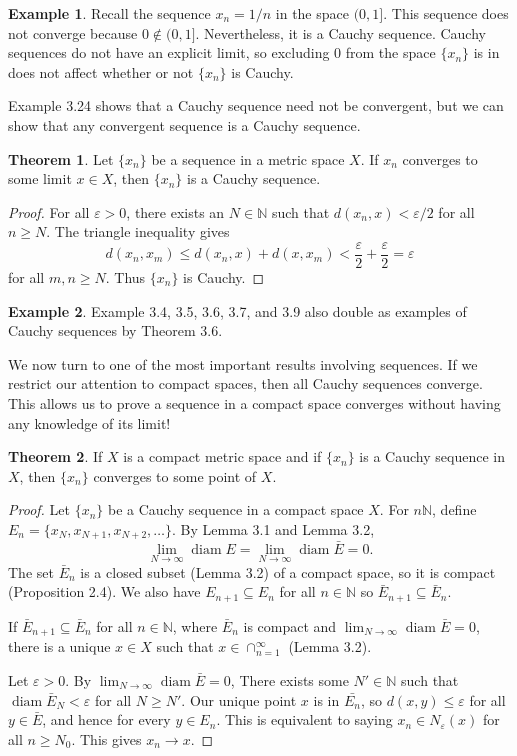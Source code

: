 \documentclass{article}
\newcommand{\N}{\mathbb{N}}
\DeclareMathOperator{\diam}{diam}
\theoremstyle{definition}
\newtheorem{theorem}{Theorem}[section]
\newtheorem{example}{Example}[section]
\begin{document}
	\begin{example}
		Recall the sequence $ x_n=1/n $ in the space $ (0,1] $. This sequence does not converge because $ 0\notin(0,1] $. Nevertheless, it is a Cauchy sequence. Cauchy sequences do not have an explicit limit, so excluding $ 0 $ from the space $ \{x_n\} $ is in does not affect whether or not $ \{x_n\} $ is Cauchy.
	\end{example}
	Example 3.24 shows that a Cauchy sequence need not be convergent, but we can show that any convergent sequence is a Cauchy sequence.
	\begin{theorem}
		Let $ \{x_n\} $ be a sequence in a metric space $ X $. If $ x_n $ converges to some limit $ x\in X $, then $ \{x_n\} $ is a Cauchy sequence. 
	\end{theorem} 
	\begin{proof}
		For all $ \varepsilon>0 $, there exists an $ N\in\N $ such that $ d(x_n,x)<\varepsilon/2 $ for all $ n\ge N $. The triangle inequality gives $$d(x_n,x_m)\le d(x_n,x)+d(x,x_m)<\frac{\varepsilon}{2}+\frac{\varepsilon}{2}=\varepsilon $$ for all $ m,n\ge N $. Thus $ \{x_n\} $ is Cauchy. 
	\end{proof}
	\begin{example}
		Example 3.4, 3.5, 3.6, 3.7, and 3.9 also double as examples of Cauchy sequences by Theorem 3.6.
	\end{example}
	We now turn to one of the most important results involving sequences. If we restrict our attention to compact spaces, then all Cauchy sequences converge. This allows us to prove a sequence in a compact space converges without having any knowledge of its limit! 
	\begin{theorem}
		If $ X $ is a compact metric space and if $ \{x_n\} $ is a Cauchy sequence in $ X $, then $ \{x_n\} $ converges to some point of $ X $.
	\end{theorem}
	\begin{proof}
		Let $ \{x_n\} $ be a Cauchy sequence in a compact space $ X $. For $ n\N $, define $ E_n=\{x_N,x_{N+1},x_{N+2},\ldots\} $. By Lemma 3.1 and Lemma 3.2, $$ \lim_{N\to\infty} \diam E=\lim_{N\to\infty} \diam\bar{E}=0. $$ The set $ \bar{E}_n $ is a closed subset (Lemma 3.2) of a compact space, so it is compact (Proposition 2.4). We also have $ E_{n+1}\subseteq E_n $ for all $ n\in\N $ so $ \bar{E}_{n+1}\subseteq \bar{E}_n $.
		
		If  $ \bar{E}_{n+1}\subseteq \bar{E}_n $ for all $ n\in\N $, where $ \bar{E}_n $ is compact and 	$ \lim_{N\to\infty} \diam\bar{E}=0 $, there is a unique $ x\in X $ such that $ x\in\cap_{n=1}^\infty $  (Lemma 3.2). 
		
		Let $ \varepsilon>0 $. By $ \lim_{N\to\infty} \diam\bar{E}=0 $, There exists some $ N'\in\N $ such that $ \diam\bar{E}_N<\varepsilon $ for all $ N\ge N' $. Our unique point $ x $ is in $ \bar{E_n} $, so $ d(x,y)\le\varepsilon $ for all $ y\in\bar{E} $, and hence for every $ y\in E_n $. This is equivalent to saying $ x_n\in N_\varepsilon(x) $ for all $ n\ge N_0 $. This gives $ x_n\to x $. 
	\end{proof}
\end{document}
